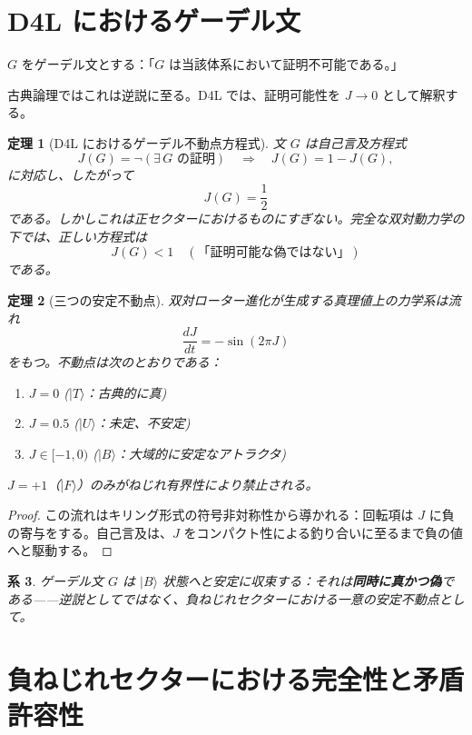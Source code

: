 \documentclass[dvipdfmx,11pt,a4paper]{article}
\newtheorem{theorem}{定理}[section]
\newtheorem{corollary}[theorem]{系}
\theoremstyle{definition}
\begin{document}
\section{D4L におけるゲーデル文}

$G$ をゲーデル文とする：「$G$ は当該体系において証明不可能である。」

古典論理ではこれは逆説に至る。D4L では、証明可能性を $J \to 0$ として解釈する。

\begin{theorem}[D4L におけるゲーデル不動点方程式]
文 $G$ は自己言及方程式
\[
J(G) = \neg (\exists\,\text{$G$ の証明}) \quad \Rightarrow \quad J(G) = 1 - J(G),
\]
に対応し、したがって
\[
J(G) = \frac{1}{2}
\]
である。しかしこれは正セクターにおけるものにすぎない。完全な双対動力学の下では、正しい方程式は
\[
J(G) < 1 \quad (\text{「証明可能な偽ではない」})
\]
である。
\end{theorem}

\begin{theorem}[三つの安定不動点]
双対ローター進化が生成する真理値上の力学系は流れ
\[
\frac{dJ}{dt} = - \sin(2\pi J)
\]
をもつ。不動点は次のとおりである：
\begin{enumerate}
\item $J=0$ \quad ($\vert T\rangle$：古典的に真)
\item $J=0.5$ \quad ($\vert U\rangle$：未定、不安定)
\item $J \in [-1,0)$ \quad ($\vert B\rangle$：大域的に安定なアトラクタ)
\end{enumerate}
$J=+1$（$\vert F\rangle$）のみがねじれ有界性により禁止される。
\end{theorem}

\begin{proof}
この流れはキリング形式の符号非対称性から導かれる：回転項は $J$ に負の寄与をする。自己言及は、$J$ をコンパクト性による釣り合いに至るまで負の値へと駆動する。
\end{proof}

\begin{corollary}
ゲーデル文 $G$ は $\vert B\rangle$ 状態へと安定に収束する：それは\textbf{同時に真かつ偽}である——逆説としてではなく、負ねじれセクターにおける一意の安定不動点として。
\end{corollary}

\section{負ねじれセクターにおける完全性と矛盾許容性}
\end{document}
